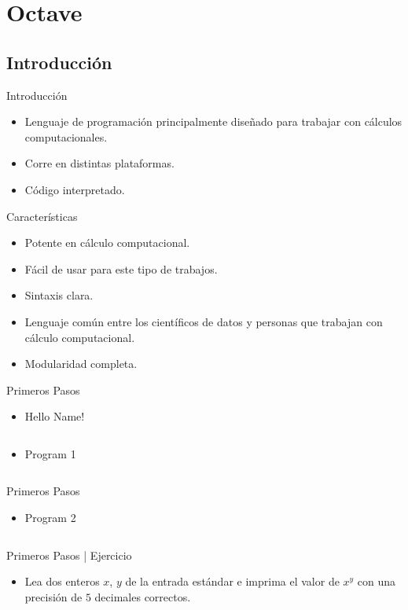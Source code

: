 \documentclass[usenames, dvipsnames, compress]{beamer}
\begin{document}
	\section{Octave}
	\subsection{Introducción}
	\begin{frame}{Introducción}
	\begin{itemize}[<+- | alert@ +>]
		\item Lenguaje de programación principalmente diseñado para trabajar con cálculos computacionales.
		\item Corre en distintas plataformas.
		\item Código interpretado.
	\end{itemize}
	\end{frame}
	\begin{frame}{Características}
	\begin{itemize}[<+- | alert@+>]
		\item Potente en cálculo computacional.
		\item Fácil de usar para este tipo de trabajos.
		\item Sintaxis clara.
		\item Lenguaje común entre los científicos de datos y personas que trabajan con cálculo computacional.
		\item Modularidad completa.
	\end{itemize}
	\end{frame}
	\begin{frame}{Primeros Pasos}
		\begin{itemize}
			\item [] \begin{block}{Hello Name!}
			\inputminted[xleftmargin=\parindent,linenos]{octave}{codes/hello.m}
		\end{block}
		\pause
		\item [] \begin{block}{Program 1}
			\inputminted[xleftmargin=\parindent,linenos]{python}{codes/program1.m}
			\end{block}
		\end{itemize}
	\end{frame}
	\begin{frame}{Primeros Pasos}
		\begin{itemize}
			\item []
			\begin{block}{Program 2}
				\inputminted[xleftmargin=\parindent,linenos]{python}{codes/program2.m}
			\end{block}
		\end{itemize}
	\end{frame}
	\begin{frame}{Primeros Pasos | Ejercicio}
			\begin{itemize}
				\item Lea dos enteros $x$, $y$ de la entrada estándar e imprima el valor de $x^y$ con una precisión de $5$ decimales correctos.
			\end{itemize}
		\end{frame}
\end{document}
